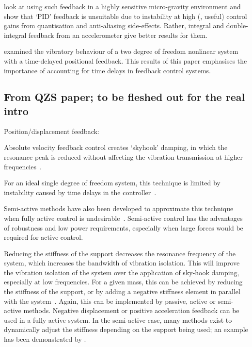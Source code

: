 \textcite{zhu2006} look at using such feedback in a highly sensitive
micro-gravity environment and show that `PID' feedback is unsuitable due to
instability at high (\ie, useful) control gains from quantisation and
anti-aliasing side-effects.
Rather, integral and double-integral feedback from
an accelerometer give better results for them.

\textcite{zhao2007} examined the vibratory behaviour of a two degree of
freedom nonlinear system with a time-delayed positional feedback.
This results
of this paper emphasises the importance of accounting for time delays in
feedback control systems.

\subsection{From QZS paper; to be fleshed out for the real intro}

Position/displacement feedback: \cite{mahmoodi2009}

Absolute velocity feedback control creates `skyhook' damping, in which
the resonance peak is reduced without affecting the vibration
transmission at higher frequencies~\cite{yan2006}.

For an ideal single degree of freedom system, this technique is limited by
instability caused by time delays in the
controller~\cite{ananthaganeshan2001,elliott2004,brennan2007}.

Semi-active methods have also been developed to approximate this
technique when fully active control is
undesirable~\cite{liu2002,liu2005,ahmadian2004}.
Semi-active control
has the advantages of robustness and low power requirements,
especially when large forces would be required for active control.

Reducing the stiffness of the support decreases the resonance
frequency of the system, which increases the bandwidth of vibration
isolation.
This will improve the vibration isolation of the system
over the application of sky-hook damping, especially at low
frequencies.
For a given mass, this can be achieved by reducing the
stiffness of the support, or by adding a negative stiffness element in
parallel with the system~\cite{lee2007,xing2005}.
Again, this can be
implemented by passive, active or semi-active methods.
Negative
displacement or positive acceleration feedback can be used in a fully
active system.
In the semi-active case, many methods exist to
dynamically adjust the stiffness depending on the support being used;
an example has been demonstrated by \textcite{kidner2002}.

